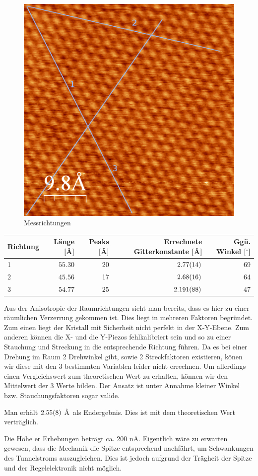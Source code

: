 \documentclass[a4paper,german,12pt,smallheadings]{scrartcl}
\begin{document}
\begin{figure}[h!]
  \centering
  \includegraphics[width=0.5 \textwidth]{atomic.png}
  \caption{Messrichtungen}
\end{figure}

\vspace{5mm}
 \begin{tabular}{l|r|r|r|r}
   Richtung & Länge [\AA] & Peaks [\AA] & Errechnete Gitterkonstante [\AA] & Ggü. Winkel [${}^\circ$] \\
   \hline
   1 & $\num{55.30}$ & 20 & $\num{2.77+-0.14}$   & 69 \\
   2 & $\num{45.56}$ & 17 & $\num{2.68+-0.16}$   & 64 \\
   3 & $\num{54.77}$ & 25 & $\num{2.191+-0.088}$ & 47 \\
 \end{tabular}
\vspace{5mm}

Aus der Anisotropie der Raumrichtungen sieht man bereits, dass es hier zu einer
räumlichen Verzerrung gekommen ist. Dies liegt in mehreren Faktoren begründet.
Zum einen liegt der Kristall mit Sicherheit nicht perfekt in der X-Y-Ebene. Zum
anderen können die X- und die Y-Piezos fehlkalibriert sein und so zu einer
Stauchung und Streckung in die entsprechende Richtung führen. Da es bei einer
Drehung im Raum 2 Drehwinkel gibt, sowie 2 Streckfaktoren existieren, könen wir
diese mit den 3 bestimmten Variablen leider nicht errechnen. Um allerdings
einen Vergleichswert zum theoretischen Wert zu erhalten, können wir den
Mittelwert der 3 Werte bilden. Der Ansatz ist unter Annahme kleiner Winkel bzw.
Stauchungsfaktoren sogar valide.

Man erhält $\num{2.55+-0.08}$ \AA \, als Endergebnis. Dies ist mit dem
theoretischen Wert verträglich.

Die Höhe er Erhebungen beträgt ca. 200 nA. Eigentlich wäre zu erwarten gewesen,
dass die Mechanik die Spitze entsprechend nachfährt, um Schwankungen des
Tunnelstroms auszugleichen. Dies ist jedoch aufgrund der Trägheit der Spitze
und der Regelelektronik nicht möglich.
\end{document}
